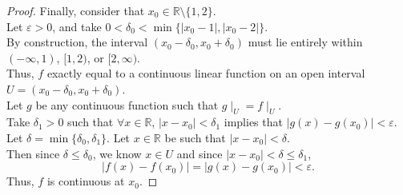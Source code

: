 \documentclass{article}
\begin{document}
\begin{proof}
    Finally, consider that $x_0 \in \mathbb R \setminus \{1,2\}$. \\
    Let $\varepsilon > 0$, and take $0<\delta_0 < \min \{|x_0-1|,|x_0-2|\}$. \\
    By construction, the interval $(x_0-\delta_0, x_0+\delta_0)$ must lie entirely within $(-\infty, 1)$, $[1,2)$, or $[2,\infty)$. \\
    Thus, $f$ exactly equal to a continuous linear function on an open interval $U=(x_0-\delta_0, x_0+\delta_0)$. \\
    Let $g$ be any continuous function such that $g\mid_U = f\mid_U$. \\
    Take $\delta_1 >0$ such that $\forall x \in \mathbb R$, $|x-x_0|<\delta_1$ implies that $|g(x)-g(x_0)| < \varepsilon$. \\
    Let $\delta = \min \{\delta_0, \delta_1\}$. 
    Let $x \in \mathbb R$ be such that $|x-x_0| < \delta$. \\
    Then since $\delta \le \delta_0$, we know $x \in U$ and since $|x-x_0|<\delta \le \delta_1$,
    \[|f(x)-f(x_0)|=|g(x)-g(x_0)|< \varepsilon.\]
    Thus, $f$ is continuous at $x_0$.
\end{proof}
\end{document}
